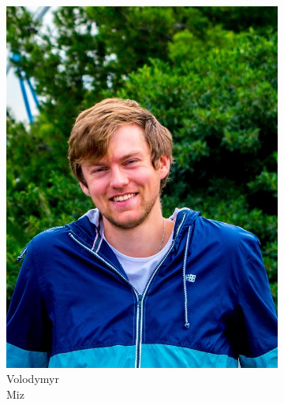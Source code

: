 \documentclass[aspectratio=169]{beamer}
\begin{document}
\begin{frame}
\begin{figure}
\begin{subfigure}[b]{0.14\linewidth}
			\includegraphics[width=\linewidth]{picture_volodymyr}
			\caption*{Volodymyr\\Miz}
		\end{subfigure}
		\hfill
		\begin{subfigure}[b]{0.14\linewidth}

\end{subfigure}
\end{figure}
\end{frame}
\end{document}
